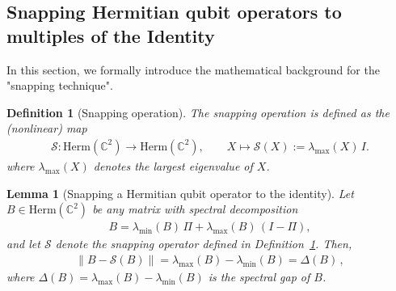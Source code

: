 \documentclass[11pt]{article}
\theoremstyle{plain}
\newtheorem{lemma}[theorem]{Lemma}
\newtheorem{definition}[theorem]{Definition}
\begin{document}
\subsection{Snapping Hermitian qubit operators to multiples of the Identity}

In this section, we formally introduce the mathematical background for the "snapping technique".

\begin{definition}[Snapping operation]\label{def:snapping-operator}
The snapping operation is defined as the (nonlinear) map
\begin{align}
\mathcal{S} : \mathrm{Herm}(\mathbb{C}^{2}) \rightarrow \mathrm{Herm}(\mathbb{C}^{2}), \quad\quad X \mapsto \mathcal{S}(X) := \lambda_{\max}(X)\, I.
\end{align}
where $\lambda_{\max}(X)$ denotes the largest eigenvalue of $X$. 
\end{definition}
\begin{lemma}[Snapping a Hermitian qubit operator to the identity]\label{lemma:snapping-hermitian-qubit-hermitian-operator}
Let $B \in \mathrm{Herm}(\mathbb{C}^{2})$ be any matrix with spectral decomposition
\begin{align}
B = \lambda_{\min}(B)\,\Pi + \lambda_{\max}(B)\,(I-\Pi),
\end{align}
and let $\mathcal{S}$ denote the snapping operator defined in Definition~\ref{def:snapping-operator}. Then,
\begin{align}
\|B - \mathcal{S}(B)\|
= \lambda_{\max}(B) - \lambda_{\min}(B) = \Delta(B) \, ,
\end{align}
where $\Delta(B) = \lambda_{\max}(B) - \lambda_{\min}(B)$ is the spectral gap of $B$.
\end{lemma}
\end{document}
